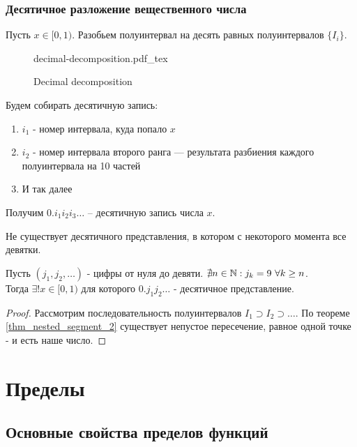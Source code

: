 \documentclass[12pt]{report}
\newcommand{\incfig}[1]{%
    \def\svgwidth{\columnwidth}
    {#1.pdf_tex}
}
\begin{document}
\subsection{Десятичное разложение вещественного числа}\label{ques_13}
Пусть $x \in  [0, 1)$. Разобьем полуинтервал на десять равных полуинтервалов $\{I_i\}$.
\begin{figure}[ht]
    \centering
    \incfig{decimal-decomposition}
    \caption{Decimal decomposition}
    \label{fig:decimal-decomposition}
\end{figure}
Будем собирать десятичную запись:
\begin{enumerate}
    \item $i_1$  - номер интервала, куда попало $x$ 
    \item $i_2$ - номер интервала второго ранга --- результата разбиения каждого полуинтервала на 10 частей
    \item
	И так далее
\end{enumerate}
Получим $0.i_1i_2i_3 \ldots $ -- десятичную запись числа $x$.
\begin{note}
    Не существует десятичного представления, в котором с некоторого момента все девятки.
\end{note}
\begin{thm}
    Пусть $(j_1, j_2, \ldots )$ - цифры от нуля до девяти. $\nexists n \in \mathbb{N}: j_k = 9 ~ \forall k \ge n$.\\
    Тогда $\exists ! x \in [0, 1) $ для которого $0.j_1j_2 \ldots $ - десятичное представление.
\end{thm}
\begin{proof}
    Рассмотрим последовательность полуинтервалов $I_1 \supset I_2 \supset \ldots $. По теореме \ref{thm_nested_segment_2} существует непустое пересечение, равное одной точке - и есть наше число.
\end{proof}
\chapter{Пределы}
\section{Основные свойства пределов функций}
\end{document}
